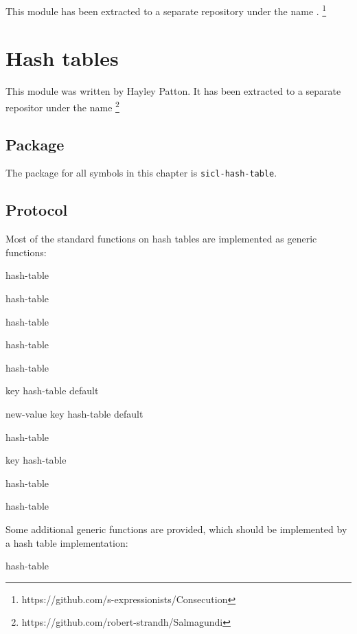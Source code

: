 This module has been extracted to a separate repository under the name
\consecution{}.%
\footnote{https://github.com/s-expressionists/Consecution}

\section{Hash tables}
\label{sec-hash-tables}

This module was written by Hayley Patton.  It has been extracted to a
separate repositor under the name \salmagundi{}%
\footnote{https://github.com/robert-strandh/Salmagundi}

\subsection{Package}

The package for all symbols in this chapter is \texttt{sicl-hash-table}.

\subsection{Protocol}

Most of the standard functions on hash tables are implemented as
generic functions:

{\small{} {hash-table}
}

{\small{} {hash-table}
}

{\small{} {hash-table}
}

{\small{} {hash-table}
}

{\small{} {hash-table}
}

{\small{} {key hash-table \optional default}
}

{\small{} {new-value key hash-table \optional default}
}

{\small{} {hash-table}
}

{\small{} {key hash-table}
}

{\small{} {hash-table}
}

{\small{} {hash-table}
}

Some additional generic functions are provided, which should be implemented
by a hash table implementation:

 {hash-table}

